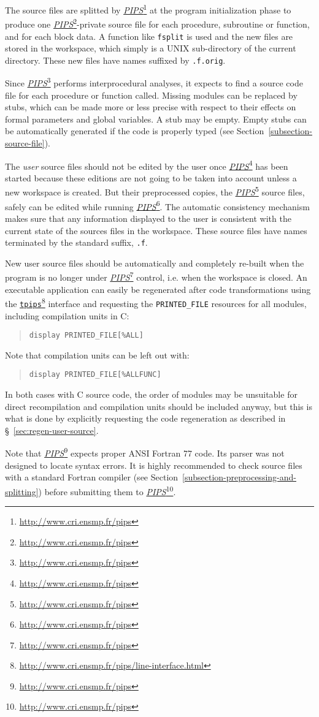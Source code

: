 \documentclass[a4paper]{report}
\newcommand{\LINK}[2]{\href{#2}{#1}\footnote{\url{#2}}\xspace}
\newcommand{\PIPS}{\LINK{\emph{PIPS}}{http://www.cri.ensmp.fr/pips}}
\newcommand{\TPIPS}{\LINK{\texttt{tpips}}{http://www.cri.ensmp.fr/pips/line-interface.html}}
\begin{document}
The source files are splitted by \PIPS{} at the
program initialization phase to produce one \PIPS{}-private source file
for each procedure, subroutine or function, and for each block data. A
function like \verb+fsplit+ is used and the new files are stored in the
workspace, which simply is a UNIX sub-directory of the current directory.
These new files have names suffixed by {\tt .f.orig}.

Since \PIPS{} performs interprocedural analyses, it expects to find a
source code file for each procedure or function called. Missing modules
can be replaced by stubs, which can be made more or less precise with
respect to their effects on formal parameters and global variables. A
stub may be empty. Empty stubs can be automatically generated if the code
is properly typed (see Section~\ref{subsection-source-file}).

The {\em user} source files should not be edited by the user once \PIPS{}
has been started because these editions are not going to be taken into
account unless a new workspace is created.
But their preprocessed copies, the
\PIPS{} source files, safely can be edited while running \PIPS{}. The
automatic consistency mechanism makes sure that any information
displayed to the user is consistent with the current state of the
sources files in the workspace. These source files have names terminated
by the standard suffix, {\tt .f}.

New user source files should be automatically and completely re-built when the program
is no longer under \PIPS{} control, i.e. when the
workspace is closed. An executable application can easily be regenerated
after code transformations using the \TPIPS{} interface and requesting the
{\tt PRINTED\_FILE} resources for all modules, including compilation units in C:
\begin{quote}
{\tt display PRINTED\_FILE[\%ALL]}
\end{quote}
Note that compilation units can be left out with:
\begin{quote}
{\tt display PRINTED\_FILE[\%ALLFUNC]}
\end{quote}
In both cases with C source code, the order of modules may be unsuitable
for direct recompilation and compilation units should be included anyway,
but this is what is done by explicitly requesting the code regeneration as
described in \S~\ref{sec:regen-user-source}.

Note that \PIPS{} expects proper ANSI Fortran 77 code. Its parser was not
designed to locate syntax errors. It is highly recommended to check source
files with a standard Fortran compiler (see
Section~\ref{subsection-preprocessing-and-splitting}) before submitting them to
\PIPS{}.
\end{document}
